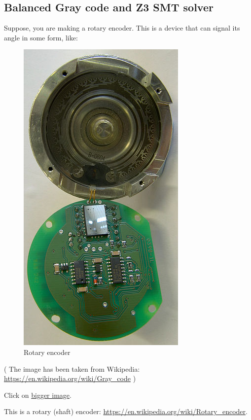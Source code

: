 \subsection{Balanced Gray code and Z3 SMT solver}
\label{Gray_Z3}

Suppose, you are making a rotary encoder.
This is a device that can signal its angle in some form, like:

\begin{figure}[H]
\centering
\includegraphics[scale=1]{SMT/gray/313px-Gray_code_rotary_encoder_13-track_opened.jpg}
\caption{Rotary encoder}
\end{figure}

( The image has been taken from Wikipedia: \url{https://en.wikipedia.org/wiki/Gray_code} )

Click on \href{https://raw.githubusercontent.com/dennis714/yurichev.com/master/blog/gray/Gray_code_rotary_encoder_13-track_opened.jpg}{bigger image}.

This is a rotary (shaft) encoder: \url{https://en.wikipedia.org/wiki/Rotary_encoder}.

